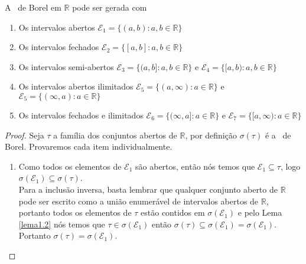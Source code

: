 \begin{proposicao} \label{prop1.1}
    
    A \sig \ de Borel em $\mathbb{R}$ pode ser gerada com
    
    \begin{enumerate}[label=(\roman*)]
        \item Os intervalos abertos $\mathcal{E}_1 = \{ (a,b) : a,b \in \mathbb{R} \}  $
        
        \item Os intervalos fechados $\mathcal{E}_2 = \{ [a,b] : a,b \in \mathbb{R} \}  $
        
        \item Os intervalos semi-abertos $\mathcal{E}_3 = \{ (a,b] : a,b \in \mathbb{R} \}  $ e $\mathcal{E}_4 = \{ [a,b) : a,b \in \mathbb{R} \}  $
        
        \item Os intervalos abertos ilimitados $\mathcal{E}_5 = \{ (a,\infty) : a \in \mathbb{R} \}$ e $\mathcal{E}_5 = \{ (\infty,a) : a \in \mathbb{R} \}$ 
        
        \item Os intervalos fechados e ilimitados $\mathcal{E}_6 = \{ (\infty,a] : a \in \mathbb{R} \} $ e $\mathcal{E}_7 = \{ [a, \infty) : a\in \mathbb{R} \}$
    \end{enumerate}

    \begin{proof}
        Seja $\tau$ a família dos conjuntos abertos de $\mathbb{R}$, por definição $\sigma(\tau)$ é a \sig \ de Borel. Provaremos cada item individualmente.
        
        \begin{enumerate}[label=(\roman*)]
        \item Como todos os elementos de $\mathcal{E}_1$ são abertos, então nós temos que $\mathcal{E}_1 \subseteq \tau$, logo $\sigma(\mathcal{E}_1) \subseteq \sigma(\tau)$. \\
        Para a inclusão inversa, basta lembrar que qualquer conjunto aberto de $\mathbb{R}$ pode ser escrito como a união enumerável de intervalos abertos de $\mathbb{R}$, portanto todos os elementos de $\tau$ estão contidos em $\sigma(\mathcal{E}_1)$ e pelo Lema \ref{lema1.2} nós temos que $\tau \in \sigma(\mathcal{E}_1)$ então $\sigma(\tau) \subseteq \sigma( \mathcal{E}_1) = \sigma(\mathcal{E}_1)$. \\
        Portanto $ \sigma(\tau) = \sigma( \mathcal{E}_1)$.
        

\end{enumerate}
\end{proof}
\end{proposicao}

